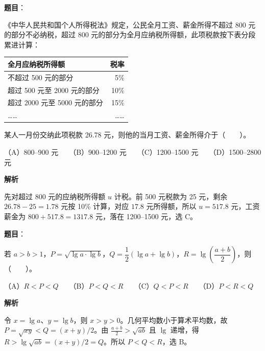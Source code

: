\begin{answer}

\textbf{题目}：

《中华人民共和国个人所得税法》规定，公民全月工资、薪金所得不超过 800 元的部分不必纳税，超过 800 元的部分为全月应纳税所得额，此项税款按下表分段累进计算：

\begin{center}
\begin{tabular}{lr}
\toprule
全月应纳税所得额 & 税率 \\
\midrule
不超过 500 元的部分 & 5\% \\
超过 500 元至 2000 元的部分 & 10\% \\
超过 2000 元至 5000 元的部分 & 15\% \\
…… & …… \\
\bottomrule
\end{tabular}
\end{center}

某人一月份交纳此项税款 26.78 元，则他的当月工资、薪金所得介于\mbox{（　　）}。

（A）800–900 元　　（B）900–1200 元　　（C）1200–1500 元　　（D）1500–2800 元

\textbf{解析}

先对超过 800 元的应纳税所得额 $u$ 计税。前 500 元税款为 25 元，剩余 $26.78-25=1.78$ 元按 10\% 计算，对应 $17.8$ 元所得额，所以 $u=517.8$ 元，工资薪金为 $800+517.8=1317.8$ 元，落在 1200–1500 元，选 C。


\end{answer}
\begin{answer}

\textbf{题目}：

若 $a>b>1$，$P=\sqrt{\lg a\cdot\lg b}$，$Q=\dfrac{1}{2}(\lg a+\lg b)$，$R=\lg\left(\dfrac{a+b}{2}\right)$，则\mbox{（　　）}。

（A）$R<P<Q$　　（B）$P<Q<R$　　（C）$Q<P<R$　　（D）$P<R<Q$

\textbf{解析}

令 $x=\lg a$、$y=\lg b$，则 $x>y>0$。几何平均数小于算术平均数，故 $P=\sqrt{xy}<Q=(x+y)/2$。由 $\frac{a+b}{2}>\sqrt{ab}$ 且 $\lg$ 递增，得 $R>\lg\sqrt{ab}=(x+y)/2=Q$。所以 $P<Q<R$，选 B。


\end{answer}
